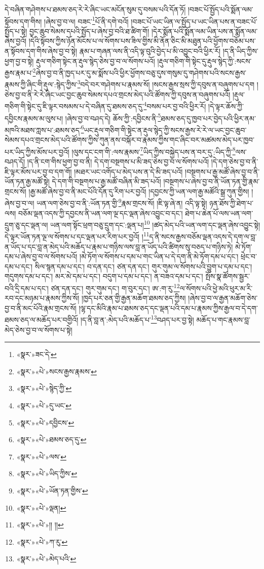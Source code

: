 དེ་བཞིན་གཤེགས་པ་ཐམས་ཅད་རེ་རེ་ཞིང་ཡང་མངོན་སུམ་དུ་བསམ་པའི་དོན་ཏོ། །བཟང་པོ་སྤྱོད་པའི་སྨོན་ལམ་སྟོབས་དག་གིས། །ཞེས་བྱ་བ་ལ། བཟང་\footnote{«སྣར་»ཟང་དེ་}པོ་ནི་དགེ་བའོ། །བཟང་པོ་ཡང་ཡིན་ལ་སྤྱོད་པ་ཡང་ཡིན་པས་ན་བཟང་པོ་སྤྱོད་པ་སྟེ། བྱང་ཆུབ་སེམས་དཔའི་སྤྱོད་པ་ཞེས་བྱ་བའི་ཐ་ཚིག་གོ། །དེར་སྨོན་པའི་སྨོན་ལམ་ཡིན་པས་ན་སྨོན་ལམ་ཞེས་བྱའོ། །དེའི་སྟོབས་ཀྱིས་ཉོན་མོངས་པ་ལ་སོགས་པས་ཟིལ་གྱིས་མི་ནོན་ཅིང་མི་མཐུན་པའི་ཕྱོགས་བཅོམ་པས་ན་སྟོབས་དག་གིས་ཞེས་བྱ་བ་སྟེ། རྣམ་པ་གཞན་ལས་ནི་འདི་ལྟ་བུའི་བྱེད་པ་མི་འབྱུང་བའི་ཕྱིར་རོ། །ད་ནི་ཡིད་ཀྱིས་ཕྱག་བྱ་བ་སྟེ། རྡུལ་གཅིག་སྟེང་ན་རྡུལ་སྙེད་ཅེས་བྱ་བ་ལ་སོགས་པའོ། །རྡུལ་གཅིག་གི་སྟེང་དུ་རྡུལ་སྙེད་ཀྱི་:སངས་རྒྱས་རྣམ་པ་\footnote{«སྣར་»«པེ་»སངས་རྒྱས་རྣམས་}ཞེས་བྱ་བ་ནི་ཁྱད་པར་དུ་མ་སྨོས་པའི་ཕྱིར་ཕྱོགས་བཅུ་དུས་གསུམ་དུ་གཤེགས་པའི་སངས་རྒྱས་རྣམས་ཀྱི་ཞིང་གི་རྡུལ་:སྙེད་ཀྱིས་\footnote{«སྣར་»«པེ་»སྙེད་ཀྱི་}བདེ་བར་གཤེགས་པ་རྣམས་སོ། །སངས་རྒྱས་སྲས་ཀྱི་དབུས་ན་བཞུགས་པ་དག །ཅེས་བྱ་བ་ནི་རེ་རེ་ཞིང་ཡང་བྱང་ཆུབ་སེམས་དཔའ་གྲངས་མེད་པའི་ཚོགས་ཀྱི་དབུས་ན་བཞུགས་པའོ། །རྡུལ་གཅིག་གི་སྟེང་དུ་ཇི་ལྟར་བསམས་པ་དེ་བཞིན་དུ་ཐམས་ཅད་དུ་\footnote{«སྣར་»«པེ་»དུ་ཡང་}བསམ་པར་བྱ་བའི་ཕྱིར་རོ། །དེ་ལྟར་ཆོས་ཀྱི་དབྱིངས་རྣམས་མ་ལུས་པ། །ཞེས་བྱ་བ་བཤད་དེ། ཆོས་ཀྱི་:དབྱིངས་ནི་\footnote{«སྣར་»«པེ་»དབྱིངས་}ཐམས་ཅད་དུ་ཁྱབ་པར་བྱེད་པའི་ཕྱིར་ནམ་མཁའི་མཐས་ཀླས་པ་:ཐམས་ཅད་\footnote{«སྣར་»«པེ་»ཐམས་ཅད་དུ་}ཡང་རྡུལ་གཅིག་གི་སྟེང་ན་རྡུལ་སྙེད་ཀྱི་སངས་རྒྱས་རེ་རེ་ལ་ཡང་བྱང་ཆུབ་སེམས་དཔའ་གྲངས་མེད་པའི་ཚོགས་ཀྱིས་ཀུན་ནས་བསྐོར་བ་རྣམས་ཀྱིས་གང་ཞིང་བར་མཚམས་མེད་པར་ཁྱབ་པར་ཡིད་ཀྱིས་མོས་པར་བྱའོ། །ལུས་དང་ངག་གི་:ལས་རྣམས་\footnote{«སྣར་»«པེ་»ལས་}ཡིད་ཀྱིས་བསྐྱེད་པས་ན་བར་དུ་:ཡིད་ཀྱི་\footnote{«སྣར་»«པེ་»ཡིད་ཀྱིས་}ལས་བཤད་དོ། །ད་ནི་ངག་གིས་ཕྱག་བྱ་བ་ནི། དེ་དག་བསྔགས་པ་མི་ཟད་ཅེས་བྱ་བ་ལ་སོགས་པའོ། །དེ་དག་ཅེས་བྱ་བ་ནི་ཇི་ལྟར་མོས་པར་བྱ་བ་དག་གོ། །མཐར་ཡང་འགོད་པ་མེད་པས་ན་དེ་མི་ཟད་པའོ། །བསྔགས་པ་རྒྱ་མཚོ་ཞེས་བྱ་བ་ནི་ཡོན་ཏན་རྒྱ་མཚོ་སྟེ། དེ་དག་གི་བསྔགས་པ་རྒྱ་མཚོ་བཞིན་མི་ཟད་པའོ། །བསྔགས་པ་ཞེས་བྱ་བ་ནི་ཡོན་ཏན་གྱི་རྣམ་གྲངས་སོ། །རྒྱ་མཚོ་ཞེས་བྱ་བ་ནི་མང་པོའི་དོན་དུ་རིག་པར་བྱའོ། །དབྱངས་ཀྱི་ཡན་ལག་རྒྱ་མཚོའི་སྒྲ་ཀུན་གྱིས། །ཞེས་བྱ་བ་ལ། ཡན་ལག་ཅེས་བྱ་བ་ནི་:ཡོན་ཏན་གྱི་\footnote{«སྣར་»«པེ་»ཡོན་ཏན་གྱིས་}རྣམ་གྲངས་སོ། །ཇི་ལྟ་ཞེ་ན། འདི་ལྟ་སྟེ། ཉན་ཐོས་ཀྱི་ཐེག་པ་ལས། བཅོམ་ལྡན་འདས་ཀྱི་དབྱངས་ནི་ཡན་ལག་ལྔ་དང་ལྡན་ཞེས་འབྱུང་བ་དང་། ཐེག་པ་ཆེན་པོ་ལས་ཡན་ལག་དྲུག་ཅུ་དང་ལྡན་ལ། ཡན་ལག་སྟོང་ཕྲག་བཅུ་དྲུག་དང་:ལྡན་པ།\footnote{«སྣར་»«པེ་»ལྡན།} །ཚད་མེད་པའི་ཡན་ལག་དང་ལྡན་ཞེས་འབྱུང་སྟེ། དེ་ལྟར་ཡོན་ཏན་ལྔ་ལ་སོགས་པ་དང་ལྡན་པར་རིག་པར་བྱའོ། །\footnote{«སྣར་»«པེ་»།། །།}ད་ནི་སངས་རྒྱས་བཅོམ་ལྡན་འདས་དེ་དག་ལ་བླ་ན་ཡོད་པ་དང་བླ་ན་མེད་པའི་མཆོད་པ་རྣམ་པ་གཉིས་ལས་བླ་ན་ཡོད་པའི་ཚིགས་སུ་བཅད་པ་གཉིས་ཏེ། མེ་ཏོག་དམ་པ་ཞེས་བྱ་བ་ལ་སོགས་པའོ། །མེ་ཏོག་ལ་སོགས་པ་དམ་པ་གང་ཡིན་པ་དེ་དག་ནི་མེ་ཏོག་དམ་པ་དང་། ཕྲེང་བ་དམ་པ་དང་། སིལ་སྙན་དམ་པ་དང་། བ་དན་དང་། ཙན་དན་དང་། གུར་གུམ་ལ་སོགས་པའི་བྱུག་པ་དམ་པ་དང་། གདུགས་དམ་པ་དང་། མར་མེ་དམ་པ་དང་། བདུག་པ་དམ་པ་དང་། ན་བཟའ་དམ་པ་དང་། སྤོས་སྣ་ཚོགས་སྦྱར་བའི་དྲི་དམ་པ་དང་། ཙན་དན་དང་། གུར་གུམ་དང་། ག་བུར་དང་། ཨ་:ག་རུ་\footnote{«སྣར་»«པེ་»ཀ་རུ་}ལ་སོགས་པའི་ཕྱེ་མའི་ཕུར་མ་རི་རབ་དང་མཉམ་པ་རྣམས་ཀྱིས་སོ། །ཁྱད་པར་ཅན་གྱི་རྒྱན་མཆོག་ཐམས་ཅད་ཀྱིས། །ཞེས་བྱ་བ་ལ་རྒྱན་མཆོག་ཅེས་བྱ་བ་ནི་མང་པོའི་རྣམ་གྲངས་སོ། །ལྷ་དང་མིའི་རྣམ་པ་ཐམས་ཅད་དང་ལྡན་པའི་དམ་པ་རྣམས་ཀྱིས་རྒྱལ་བ་དེ་དག་ཐམས་ཅད་ལ་མཆོད་པར་བགྱིའོ། །ད་ནི་བླ་ན་:མེད་པའི་མཆོད་པ་\footnote{«སྣར་»«པེ་»མེད་པའི་}བཤད་པར་བྱ་སྟེ། མཆོད་པ་གང་རྣམས་བླ་མེད་ཅེས་བྱ་བ་ལ་སོགས་པ་སྟེ། 